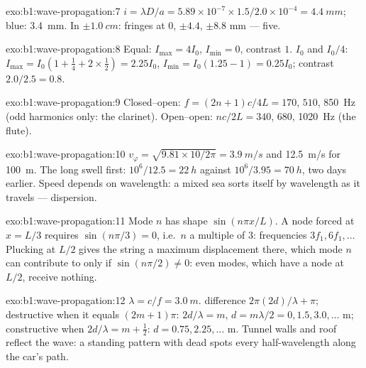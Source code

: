 \begin{solution}{exo:b1:wave-propagation:7}
$i = \lambda D/a = 5.89\times10^{-7} \times 1.5/2.0\times10^{-4} =
\qty{4.4}{mm}$; blue: \qty{3.4}{mm}. In $\pm\qty{1.0}{cm}$: fringes at
$0$, $\pm 4.4$, $\pm 8.8$ mm --- five.
\end{solution}

\begin{solution}{exo:b1:wave-propagation:8}
Equal: $I_{\max} = 4I_0$, $I_{\min} = 0$, contrast $1$. $I_0$ and $I_0/4$:
$I_{\max} = I_0(1 + \tfrac14 + 2 \times \tfrac12) = 2.25I_0$, $I_{\min} =
I_0(1.25 - 1) = 0.25I_0$; contrast $2.0/2.5 = 0.8$.
\end{solution}

\begin{solution}{exo:b1:wave-propagation:9}
Closed--open: $f = (2n + 1)c/4L = 170$, $510$, \qty{850}{Hz} (odd
harmonics only: the clarinet). Open--open: $nc/2L = 340$, $680$,
\qty{1020}{Hz} (the flute).
\end{solution}

\begin{solution}{exo:b1:wave-propagation:10}
$v_\varphi = \sqrt{9.81 \times 10/2\pi} = \qty{3.9}{m/s}$ and
\qty{12.5}{m/s} for \qty{100}{m}. The long swell first: $10^6/12.5 =
\qty{22}{h}$ against $10^6/3.95 = \qty{70}{h}$, two days earlier. Speed
depends on wavelength: a mixed sea sorts itself by wavelength as it
travels --- dispersion.
\end{solution}

\begin{solution}{exo:b1:wave-propagation:11}
Mode $n$ has shape $\sin(n\pi x/L)$. A node forced at $x = L/3$ requires
$\sin(n\pi/3) = 0$, i.e.\ $n$ a multiple of $3$: frequencies $3f_1,
6f_1, \dots$ Plucking at $L/2$ gives the string a maximum displacement
there, which mode $n$ can contribute to only if $\sin(n\pi/2) \neq 0$:
even modes, which have a node at $L/2$, receive nothing.
\end{solution}

\begin{solution}{exo:b1:wave-propagation:12}
$\lambda = c/f = \qty{3.0}{m}$.  difference $2\pi(2d)/\lambda + \pi$;
destructive when it equals $(2m + 1)\pi$: $2d/\lambda = m$,
$d = m\lambda/2 = 0, 1.5, 3.0, \dots$ m; constructive when $2d/\lambda =
m + \tfrac12$: $d = 0.75, 2.25, \dots$ m. Tunnel walls and roof reflect
the wave: a standing pattern with dead spots every half-wavelength along
the car's path.
\end{solution}

